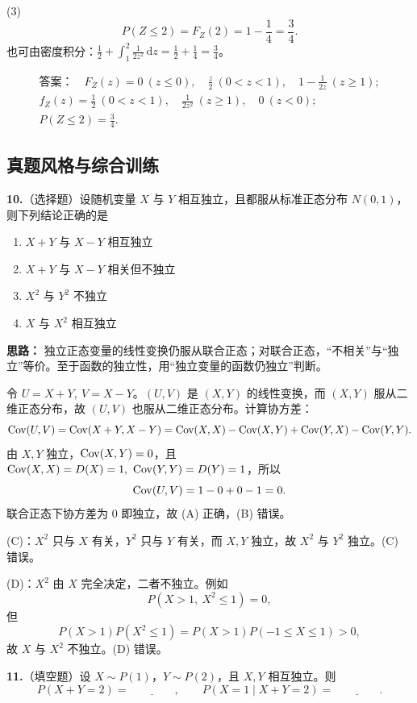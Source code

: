 (3)
\[
P(Z\leq2)=F_Z(2)=1-\frac{1}{4}=\frac34.
\]
也可由密度积分：$\frac12+\int_1^2\frac{1}{2z^2}\,\mathrm dz=\frac12+\frac14=\frac34$。

\[
\boxed{\begin{gathered}
\textbf{答案：}\quad F_Z(z)=0\ (z\leq0),\quad \frac z2\ (0<z<1),\quad 1-\frac{1}{2z}\ (z\geq1);\\
f_Z(z)=\frac12\ (0<z<1),\quad \frac{1}{2z^2}\ (z\geq1),\quad 0\ (z<0);\\
P(Z\leq2)=\frac34.
\end{gathered}}
\]

\else \answerarea[10] \fi%
\subsection{真题风格与综合训练}

\textbf{10.}（选择题）设随机变量 $X$ 与 $Y$ 相互独立，且都服从标准正态分布 $N(0,1)$，则下列结论正确的是
\begin{enumerate}[label=(\Alph*)]
  \item $X+Y$ 与 $X-Y$ 相互独立
  \item $X+Y$ 与 $X-Y$ 相关但不独立
  \item $X^2$ 与 $Y^2$ 不独立
  \item $X$ 与 $X^2$ 相互独立
\end{enumerate}

\ifshowsolutions%
\textbf{思路：} 独立正态变量的线性变换仍服从联合正态；对联合正态，“不相关”与“独立”等价。至于函数的独立性，用“独立变量的函数仍独立”判断。

令 $U=X+Y,\ V=X-Y$。$(U,V)$ 是 $(X,Y)$ 的线性变换，而 $(X,Y)$ 服从二维正态分布，故 $(U,V)$ 也服从二维正态分布。计算协方差：
\[
\operatorname{Cov}(U,V)=\operatorname{Cov}(X+Y,X-Y)
=\operatorname{Cov}(X,X)-\operatorname{Cov}(X,Y)+\operatorname{Cov}(Y,X)-\operatorname{Cov}(Y,Y).
\]
由 $X,Y$ 独立，$\operatorname{Cov}(X,Y)=0$，且 $\operatorname{Cov}(X,X)=D(X)=1,\ \operatorname{Cov}(Y,Y)=D(Y)=1$，所以
\[
\operatorname{Cov}(U,V)=1-0+0-1=0.
\]
联合正态下协方差为 $0$ 即独立，故 (A) 正确，(B) 错误。

(C)：$X^2$ 只与 $X$ 有关，$Y^2$ 只与 $Y$ 有关，而 $X,Y$ 独立，故 $X^2$ 与 $Y^2$ 独立。(C) 错误。

(D)：$X^2$ 由 $X$ 完全决定，二者不独立。例如
\[
P(X>1,\ X^2\leq1)=0,
\]
但
\[
P(X>1)P(X^2\leq1)=P(X>1)P(-1\leq X\leq1)>0,
\]
故 $X$ 与 $X^2$ 不独立。(D) 错误。


\else \answerarea[8] \fi%
\textbf{11.}（填空题）设 $X\sim P(1)$，$Y\sim P(2)$，且 $X,Y$ 相互独立。则
\[
P(X+Y=2)=\underline{\qquad\qquad},\qquad
P(X=1\mid X+Y=2)=\underline{\qquad\qquad}.
\]

